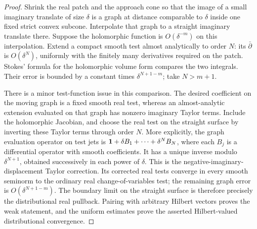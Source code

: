 \begin{proof}
Shrink the real patch and the approach cone so that the image of a
small imaginary translate of size $\delta$ is a graph at distance
comparable to $\delta$ inside one fixed strict convex subcone.
Interpolate that graph to a straight imaginary translate there.
Suppose the holomorphic function is $O(\delta^{-m})$ on this
interpolation.  Extend a compact smooth test almost analytically to
order $N$: its $\bar\partial$ is $O(\delta^N)$, uniformly with the
finitely many derivatives required on the patch.  Stokes' formula
for the holomorphic volume form compares the two integrals.  Their
error is bounded by a constant times $\delta^{N+1-m}$; take
$N>m+1$.

There is a minor test-function issue in this comparison.  The desired
coefficient on the moving graph is a fixed smooth real test, whereas
an almost-analytic extension evaluated on that graph has nonzero
imaginary Taylor terms.  Include the holomorphic Jacobian, and choose
the real test on the straight surface by inverting these Taylor terms
through order $N$.  More explicitly, the graph evaluation operator
on test jets is $\mathbf 1+\delta B_1+\cdots+\delta^N B_N$, where each
$B_j$ is a differential operator with smooth coefficients.  It has a
unique inverse modulo $\delta^{N+1}$, obtained successively in each
power of $\delta$.  This is the negative-imaginary-displacement
Taylor correction.  Its corrected real tests converge in every
smooth seminorm to the ordinary real change-of-variables test; the
remaining graph error is $O(\delta^{N+1-m})$.  The boundary limit on
the straight surface is therefore precisely the distributional real
pullback.  Pairing with arbitrary Hilbert vectors proves the weak
statement, and the uniform estimates prove the asserted
Hilbert-valued distributional convergence.
\end{proof}
